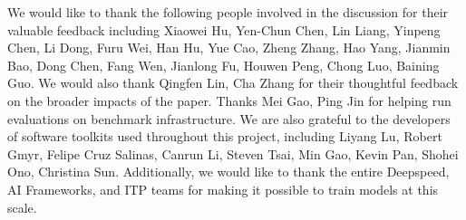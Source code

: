 \documentclass{article}
\begin{document}
We would like to thank the following people involved in the discussion for their valuable feedback including Xiaowei Hu, Yen-Chun Chen, Lin Liang, Yinpeng Chen, Li Dong, Furu Wei, Han Hu, Yue Cao, Zheng Zhang, Hao Yang, Jianmin Bao, Dong Chen, Fang Wen, Jianlong Fu, Houwen Peng, Chong Luo, Baining Guo. We would also thank Qingfen Lin, Cha Zhang for their thoughtful feedback on the broader impacts of the paper. Thanks Mei Gao, Ping Jin for helping run evaluations on benchmark infrastructure. We are also grateful to the developers
of software toolkits used throughout this project, including Liyang Lu, Robert Gmyr, Felipe Cruz Salinas, Canrun Li, Steven Tsai, Min Gao, Kevin Pan, Shohei Ono, Christina Sun. Additionally, we would like to thank the entire Deepspeed, AI Frameworks, and ITP teams for making it possible to train models at this scale.




\end{document}
